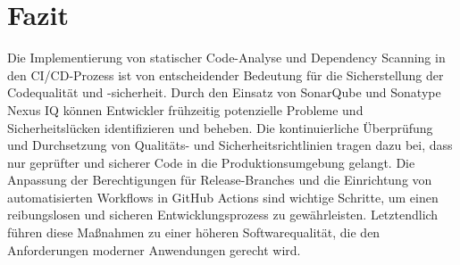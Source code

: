 \section{Fazit}
Die Implementierung von statischer Code-Analyse und Dependency Scanning in den CI/CD-Prozess ist von entscheidender Bedeutung für die Sicherstellung der Codequalität und -sicherheit. Durch den Einsatz von SonarQube und Sonatype Nexus IQ können Entwickler frühzeitig potenzielle Probleme und Sicherheitslücken identifizieren und beheben. Die kontinuierliche Überprüfung und Durchsetzung von Qualitäts- und Sicherheitsrichtlinien tragen dazu bei, dass nur geprüfter und sicherer Code in die Produktionsumgebung gelangt. Die Anpassung der Berechtigungen für Release-Branches und die Einrichtung von automatisierten Workflows in GitHub Actions sind wichtige Schritte, um einen reibungslosen und sicheren Entwicklungsprozess zu gewährleisten. Letztendlich führen diese Maßnahmen zu einer höheren Softwarequalität, die den Anforderungen moderner Anwendungen gerecht wird.